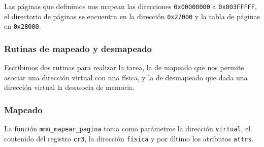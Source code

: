 Las páginas que definimos nos mapean las direcciones
\texttt{0x00000000} a \texttt{0x003FFFFF}, el directorio de páginas se encuentra
en la dirección \texttt{0x27000} y la tabla de páginas en \texttt{0x28000}.

\subsubsection{Rutinas de mapeado y desmapeado}

Escribimos dos rutinas para realizar la tarea, la de mapeado que nos permite
asociar una dirección virtual con una física, y la de desmapeado que dada una
dirección virtual la desasocia de memoria.

\subsubsection*{Mapeado}

La función \texttt{mmu\_mapear\_pagina} toma como parámetros la dirección \texttt{virtual}, el contenido del
registro \texttt{cr3}, la dirección \texttt{física} y por último los atributos
\texttt{attrs}.

